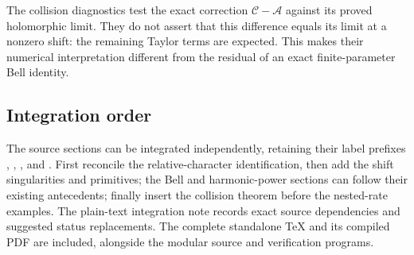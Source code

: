 The collision diagnostics test the exact correction
$\mathcal C-\mathcal A$ against its proved holomorphic limit.
They do not assert that this difference equals its limit at a nonzero
shift: the remaining Taylor terms are expected. This makes their
numerical interpretation different from the residual of an exact
finite-parameter Bell identity.

\subsection{Integration order}

The source sections can be integrated independently, retaining their
label prefixes , , , and .
First reconcile the relative-character identification, then add the
shift singularities and primitives; the Bell and harmonic-power
sections can follow their existing antecedents; finally insert the
collision theorem before the nested-rate examples. The plain-text
integration note records exact source dependencies and suggested
status replacements. The complete standalone TeX and its compiled PDF
are included, alongside the modular source and verification programs.

